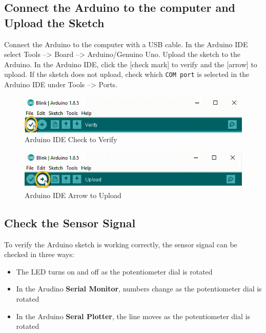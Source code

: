 \documentclass{book}
\makeatletter
\def\maxwidth{\ifdim\Gin@nat@width>\linewidth\linewidth
    \else\Gin@nat@width\fi}
\let\Oldincludegraphics\includegraphics
\renewcommand{\includegraphics}[1]{\Oldincludegraphics[width=.8\maxwidth]{#1}}
\providecommand{\tightlist}{%
      \setlength{\itemsep}{0pt}\setlength{\parskip}{0pt}}
\makeatother
\begin{document}
    
        \subsection{Connect the Arduino to the computer and Upload the
Sketch}\label{connect-the-arduino-to-the-computer-and-upload-the-sketch}
    




    
        Connect the Arduino to the computer with a USB cable. In the Arduino IDE
select Tools --\textgreater{} Board --\textgreater{} Arduino/Genuino
Uno. Upload the sketch to the Arduino. In the Arduino IDE, click the
{[}check mark{]} to verify and the {[}arrow{]} to upload. If the sketch
does not upload, check which \lstinline!COM port! is selected in the
Arduino IDE under Tools --\textgreater{} Ports.

\begin{figure}
\centering
\includegraphics{images/Check_to_Verify.png}
\caption{Arduino IDE Check to Verify}
\end{figure}

\begin{figure}
\centering
\includegraphics{images/Arrow_to_Upload.png}
\caption{Arduino IDE Arrow to Upload}
\end{figure}
    




    
        \subsection{Check the Sensor Signal}\label{check-the-sensor-signal}
    




    
        To verify the Arduino sketch is working correctly, the sensor signal can
be checked in three ways:

\begin{itemize}
\tightlist
\item
  The LED turns on and off as the potentiometer dial is rotated
\item
  In the Arudino \textbf{Serial Monitor}, numbers change as the
  potentiometer dial is rotated
\item
  In the Arduino \textbf{Seral Plotter}, the line moves as the
  potentiometer dial is rotated
\end{itemize}
    
\end{document}
